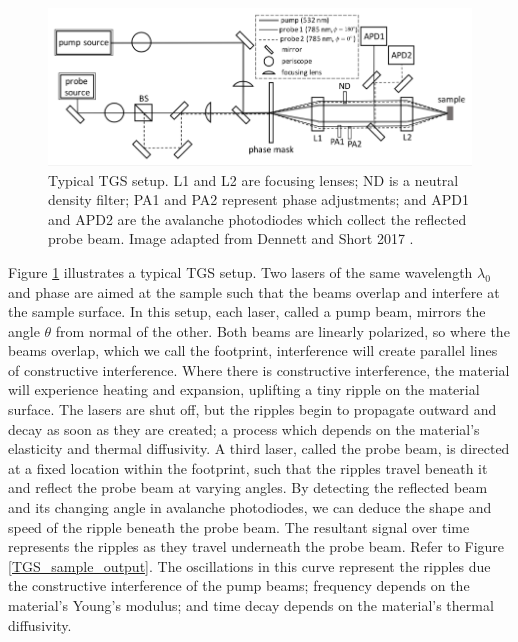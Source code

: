 \begin{figure}[thb]
\begin{center}
\includegraphics[width=\textwidth]{./images/TGS-DH_setup_Dennet_2017b_1.png}
\caption{Typical TGS setup. L1 and L2 are focusing lenses; ND is a neutral density filter; PA1 and PA2 represent phase adjustments; and APD1 and APD2 are the avalanche photodiodes which collect the reflected probe beam. Image adapted from Dennett and Short 2017 \cite{Dennett2017}.}
\label{TGS_setup}
\end{center}
\end{figure}

Figure \ref{TGS_setup} illustrates a typical TGS setup. Two lasers of the same wavelength $\lambda_{0}$ and phase are aimed at the sample such that the beams overlap and interfere at the sample surface. In this setup, each laser, called a pump beam, mirrors the angle $\theta$ from normal of the other. Both beams are linearly polarized, so where the beams overlap, which we call the footprint, interference will create parallel lines of constructive interference. Where there is constructive interference, the material will experience heating and expansion, uplifting a tiny ripple on the material surface. The lasers are shut off, but the ripples begin to propagate outward and decay as soon as they are created; a process which depends on the material's elasticity and thermal diffusivity. A third laser, called the probe beam, is directed at a fixed location within the footprint, such that the ripples travel beneath it and reflect the probe beam at varying angles. By detecting the reflected beam and its changing angle in avalanche photodiodes, we can deduce the shape and speed of the ripple beneath the probe beam. The resultant signal over time represents the ripples as they travel underneath the probe beam. Refer to Figure \ref{TGS_sample_output}. The oscillations in this curve represent the ripples due the constructive interference of the pump beams; frequency depends on the material's Young's modulus; and time decay depends on the material's thermal diffusivity.

